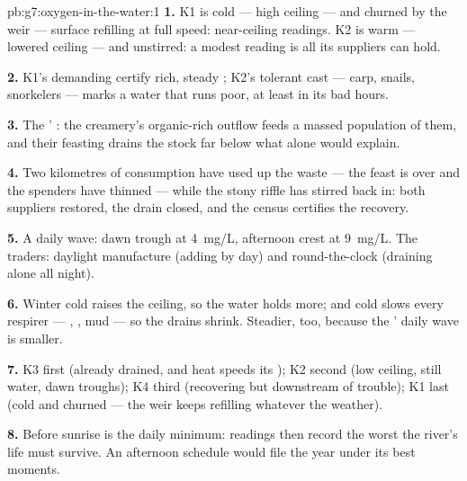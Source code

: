 \begin{solution}{pb:g7:oxygen-in-the-water:1}
\textbf{1.} K1 is cold --- high ceiling --- and churned by
the weir --- surface refilling at full speed: near-ceiling
readings. K2 is warm --- lowered ceiling --- and unstirred:
a modest reading is all its suppliers can hold.

\textbf{2.} K1's demanding  certify rich, steady
; K2's tolerant cast --- carp, snails, snorkelers ---
marks a water that runs poor, at least in its bad hours.

\textbf{3.} The ' : the creamery's
organic-rich outflow feeds a massed population of them, and
their feasting drains the stock far below what 
alone would explain.

\textbf{4.} Two kilometres of consumption have used up the
waste --- the feast is over and the spenders have thinned
--- while the stony riffle has stirred  back in: both
suppliers restored, the drain closed, and the census
certifies the recovery.

\textbf{5.} A daily wave: dawn trough at \qty{4}{mg/L},
afternoon crest at \qty{9}{mg/L}. The traders: daylight
manufacture (adding by day) and round-the-clock 
(draining alone all night).

\textbf{6.} Winter cold raises the ceiling, so the water
holds more; and cold slows every respirer --- , ,
mud  --- so the drains shrink. Steadier, too,
because the ' daily wave is smaller.

\textbf{7.} K3 first (already drained, and heat speeds its
); K2 second (low ceiling, still water, dawn
troughs); K4 third (recovering but downstream of trouble);
K1 last (cold and churned --- the weir keeps refilling
whatever the weather).

\textbf{8.} Before sunrise is the daily minimum: readings
then record the worst the river's life must survive. An
afternoon schedule would file the year under its best
moments.


\end{solution}
